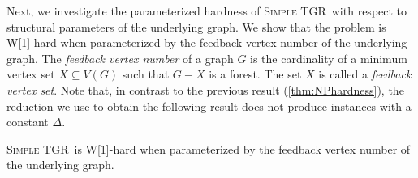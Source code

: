 \documentclass[a4paper,UKenglish,cleveref, autoref, thm-restate, anonymous]{lipics-v2021}
\newcommand{\deltaExact}{\textsc{Simple TGR}}
\begin{document}

Next, we investigate the parameterized hardness of \deltaExact\ with respect to structural parameters of the underlying graph. We show that the problem is W[1]-hard when parameterized by the feedback vertex number of the underlying graph. 
The \emph{feedback vertex number} of a graph $G$ is the cardinality of a minimum vertex set $X\subseteq V(G)$ such that $G-X$ is a forest. The set $X$ is called a \emph{feedback vertex set}. 
Note that, in contrast to the previous result (\cref{thm:NPhardness}), the reduction we use to obtain the following result does not produce instances with a constant $\Delta$.

\begin{theorem}[$\star$]\label{thm:W1wrtFVS}
    \deltaExact\ is W[1]-hard when parameterized by the feedback vertex number of the underlying graph.
\end{theorem}
\end{document}
